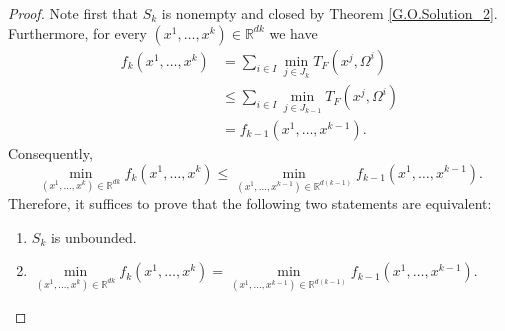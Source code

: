\documentclass[sn-mathphys-num]{sn-jnl}%
\theoremstyle{definition}
\begin{document}
\begin{proof} Note first that $S_k$ is nonempty and closed by Theorem \ref{G.O.Solution_2}. Furthermore, for every $(x^1,\dots,x^k)\in \mathbb{R}^{dk}$ we have
	\begin{equation}\label{G.O.Solutions_5_1}
		\begin{aligned}
			f_k\left(x^1,\dots,x^k \right)
			&= \sum_{i \in I} \min_{j \in J_k} T_F(x^j,\Omega^i)\\
			&\leq \sum_{i \in I} \min_{j \in J_{k-1}} T_F(x^j,\Omega^i)\\&
			= f_{k-1}\left(x^1,\dots,x^{k-1}\right).
		\end{aligned}
	\end{equation}
	Consequently,
	\begin{equation}\label{G.O.Solutions_5_2}
		\min_{(x^1,\dots,x^k)\in \mathbb{R}^{dk}} f_k\left(x^1,\dots,x^k \right)
		\leq
		\min_{(x^1,\dots,x^{k-1})\in \mathbb{R}^{d(k-1)}} f_{k-1}\left(x^1,\dots,x^{k-1} \right).
	\end{equation}
	Therefore, it suffices to prove that the following two statements are equivalent:
	\begin{enumerate}
		\item [{\rm (a')}] $S_k$ is unbounded.
		\item [{\rm (b')}] $\min\limits_{(x^1,\dots,x^k)\in \mathbb{R}^{dk}} f_k\left(x^1,\dots,x^k \right)
		=
		\min\limits_{(x^1,\dots,x^{k-1})\in \mathbb{R}^{d(k-1)}} f_{k-1}\left(x^1,\dots,x^{k-1} \right).$    
	\end{enumerate}
	

\end{proof}
\end{document}
